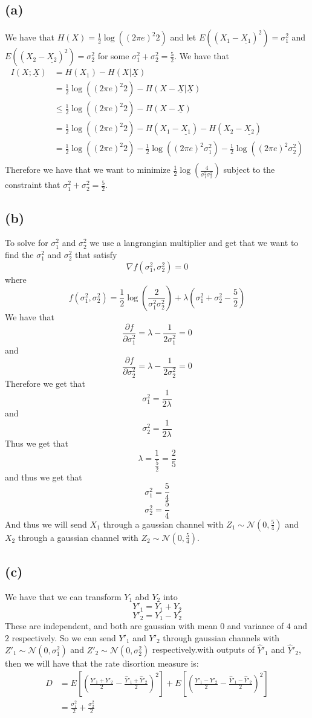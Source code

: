 \subsection*{(a)}
We have that $H(X)=\frac{1}{2}\log((2\pi e)^2 2)$ and let 
$E((X_1-\underline{X_1})^2)=\sigma_1^2$ and $E((X_2-\underline{X_2})^2)=\sigma_2^2$ for 
some $\sigma_1^2+\sigma_2^2=\frac{5}{2}$. We have that
\begin{align*}
    I(X;\underline{X})&=H(X_1)-H(X|\underline{X})\\
    &=\frac{1}{2}\log((2\pi e)^2 2)-H(X-\underline{X}|\underline{X})\\
    &\leq\frac{1}{2}\log((2\pi e)^2 2)-H(X-\underline{X})\\
    &=\frac{1}{2}\log((2\pi e)^2 2)-H(X_1-\underline{X_1})-H(X_2-\underline{X_2})\\
    &=\frac{1}{2}\log((2\pi e)^2 2)-\frac{1}{2}\log((2\pi e)^2 \sigma_1^2)-\frac{1}{2}\log((2\pi e)^2 \sigma_2^2)\\
\end{align*}
Therefore we have that we want to minimize $\frac{1}{2}\log\left(\frac{4}{\sigma_1^2\sigma_2^2}\right)$
subject to the constraint that $\sigma_1^2+\sigma_2^2=\frac{5}{2}$.
\subsection*{(b)}
To solve for $\sigma_1^2$ and $\sigma_2^2$ we use a langrangian multiplier and get that we want 
to find the $\sigma_1^2$ and $\sigma_2^2$ that satisfy
$$\nabla f(\sigma_1^2,\sigma_2^2)=0$$
where
$$f(\sigma_1^2,\sigma_2^2)=\frac{1}{2}\log\left(\frac{2}{\sigma_1^2\sigma_2^2}\right)+\lambda(\sigma_1^2+\sigma_2^2-\frac{5}{2})$$
We have that
$$\frac{\partial f}{\partial \sigma_1^2}=\lambda-\frac{1}{2\sigma_1^2}=0$$
and
$$\frac{\partial f}{\partial \sigma_2^2}=\lambda-\frac{1}{2\sigma_2^2}=0$$
Therefore we get that
$$\sigma_1^2=\frac{1}{2\lambda}$$
and
$$\sigma_2^2=\frac{1}{2\lambda}$$
Thus we get that
$$\lambda=\frac{1}{\frac{5}{2}}=\frac{2}{5}$$
and thus we get that
$$\sigma_1^2=\boxed{\frac{5}{4}}$$
$$\sigma_2^2=\boxed{\frac{5}{4}}$$
And thus we will send $X_1$ through a gaussian channel with 
$Z_1\sim \mathcal{N}(0,\frac{5}{4})$ and $X_2$ through a gaussian channel with
$Z_2\sim \mathcal{N}(0,\frac{5}{4})$.
\subsection*{(c)}
We have that we can transform $Y_1$ abd $Y_2$ into 
$$Y'_1=Y_1+Y_2$$
$$Y'_2=Y_1-Y_2$$
These are independent, and both are 
gaussian with mean 0 and variance of $4$ and $2$ respectively.
So we can send $Y'_1$ and $Y'_2$ through gaussian channels with 
$Z'_1\sim \mathcal{N}(0,\sigma_1^2)$ and $Z'_2\sim \mathcal{N}(0,\sigma_2^2)$ respectively.with 
outputs of $\hat{Y}'_1$ and $\hat{Y}'_2$, 
then we will have that the rate disortion measure is:
\begin{align*}
D&=E\left[\left(\frac{Y'_1+Y'_2}{2}-\frac{\hat{Y}'_1+\hat{Y}'_2}{2}\right)^2\right]
+E\left[\left(\frac{Y'_1-Y'_2}{2}-\frac{\hat{Y}'_1-\hat{Y}'_2}{2}\right)^2\right]\\
&=\frac{\sigma_1^2}{2}+\frac{\sigma_2^2}{2}
\end{align*}

